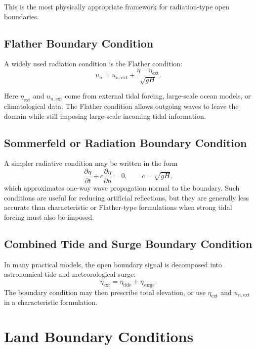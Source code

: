 \documentclass[11pt]{article}
\begin{document}
This is the most physically appropriate framework for radiation-type open boundaries.

\subsection{Flather Boundary Condition}

A widely used radiation condition is the Flather condition:
\begin{equation}
u_n = u_{n,\mathrm{ext}} + \frac{\eta - \eta_{\mathrm{ext}}}{\sqrt{gH}}.
\end{equation}

Here \(\eta_{\mathrm{ext}}\) and \(u_{n,\mathrm{ext}}\) come from external tidal forcing, large-scale ocean models, or climatological data. The Flather condition allows outgoing waves to leave the domain while still imposing large-scale incoming tidal information.

\subsection{Sommerfeld or Radiation Boundary Condition}

A simpler radiative condition may be written in the form
\begin{equation}
\frac{\partial \eta}{\partial t} + c \frac{\partial \eta}{\partial n} = 0,
\qquad c = \sqrt{gH},
\end{equation}
which approximates one-way wave propagation normal to the boundary. Such conditions are useful for reducing artificial reflections, but they are generally less accurate than characteristic or Flather-type formulations when strong tidal forcing must also be imposed.

\subsection{Combined Tide and Surge Boundary Condition}

In many practical models, the open boundary signal is decomposed into astronomical tide and meteorological surge:
\begin{equation}
\eta_{\mathrm{ext}} = \eta_{\mathrm{tide}} + \eta_{\mathrm{surge}}.
\end{equation}
The boundary condition may then prescribe total elevation, or use \(\eta_{\mathrm{ext}}\) and \(u_{n,\mathrm{ext}}\) in a characteristic formulation.

\section{Land Boundary Conditions}
\end{document}
